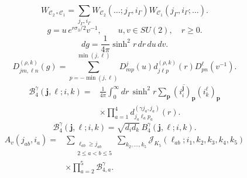 \documentclass{article}
\begin{document}
\begin{equation}
W_{\mathcal C_2\circ\mathcal C_1}=\sum_{j_\Gamma,i_\Gamma}W_{\mathcal C_2}(\ldots;j_\Gamma,i_\Gamma)W_{\mathcal C_1}(j_\Gamma,i_\Gamma;\ldots).
\tag{F6}
\end{equation}
\begin{equation}
g=u\,e^{r\sigma_3/2}v^{-1},\qquad u,v\in SU(2),\quad r\ge0.
\tag{B1}
\end{equation}
\begin{equation}
dg=\frac1{4\pi}\sinh^2r\,dr\,du\,dv.
\tag{B2}
\end{equation}
\begin{equation}
D^{(\rho,k)}_{jm,\ell n}(g)=\sum_{p=-\min(j,\ell)}^{\min(j,\ell)}D^j_{mp}(u)d^{(\rho,k)}_{j\ell p}(r)D^\ell_{pn}(v^{-1}).
\tag{B3}
\end{equation}
\begin{equation}
\boxed{\begin{aligned}
\mathcal B_4^\gamma(\mathbf j,\boldsymbol\ell;i,k)={}&\frac1{4\pi}\int_0^\infty dr\,\sinh^2r\sum_{\mathbf p}\overline{(i_i^{\mathbf j})_{\mathbf p}}(i_k^{\boldsymbol\ell})_{\mathbf p}\\
&\times\prod_{a=1}^4d^{(\gamma j_a,j_a)}_{j_a\ell_a p_a}(r).
\end{aligned}}
\tag{B4}
\end{equation}
\begin{equation}
\mathcal B_4^\gamma(\mathbf j,\boldsymbol\ell;i,k)=\sqrt{d_id_k}\,B_4^\gamma(\mathbf j,\boldsymbol\ell;i,k).
\tag{B5}
\end{equation}
\begin{equation}
\boxed{\begin{aligned}
A_v(j_{ab},i_a)={}&\sum_{\substack{\ell_{ab}\ge j_{ab}\\2\le a<b\le5}}\sum_{k_2,\ldots,k_5}
\mathcal J_{K_5}(\ell_{ab};i_1,k_2,k_3,k_4,k_5)\\
&\times\prod_{a=2}^5\mathcal B_{4,a}^\gamma.
\end{aligned}}
\tag{B6}
\end{equation}
\end{document}
